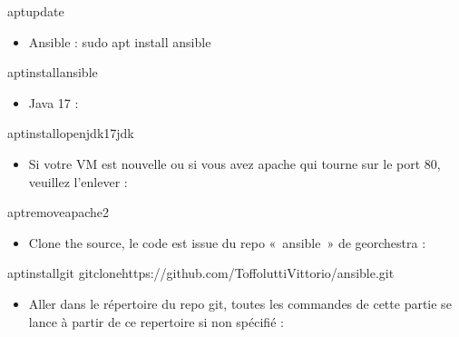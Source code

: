 \documentclass[letterpaper,10pt,french]{sphinxmanual}
\begin{document}
\begin{sphinxVerbatim}[commandchars=\\\{\}]
aptupdate
\end{sphinxVerbatim}
\begin{itemize}
\item {} 
\sphinxAtStartPar
Ansible : sudo apt install ansible

\end{itemize}

\begin{sphinxVerbatim}[commandchars=\\\{\}]
aptinstallansible
\end{sphinxVerbatim}
\begin{itemize}
\item {} 
\sphinxAtStartPar
Java 17 :

\end{itemize}

\begin{sphinxVerbatim}[commandchars=\\\{\}]
aptinstallopenjdk\PYGZhy{}17\PYGZhy{}jdk
\end{sphinxVerbatim}
\begin{itemize}
\item {} 
\sphinxAtStartPar
Si votre VM est nouvelle ou si vous avez apache qui tourne sur le port 80, veuillez l’enlever :

\end{itemize}

\begin{sphinxVerbatim}[commandchars=\\\{\}]
aptremoveapache2
\end{sphinxVerbatim}
\begin{itemize}
\item {} 
\sphinxAtStartPar
Clone the source, le code est issue du repo « ansible » de georchestra :

\end{itemize}

\begin{sphinxVerbatim}[commandchars=\\\{\}]
aptinstallgit
gitclonehttps://github.com/ToffoluttiVittorio/ansible.git
\end{sphinxVerbatim}
\begin{itemize}
\item {} 
\sphinxAtStartPar
Aller dans le répertoire du repo git, toutes les commandes de cette partie se lance à partir de ce repertoire si non spécifié :

\end{itemize}
\end{document}
